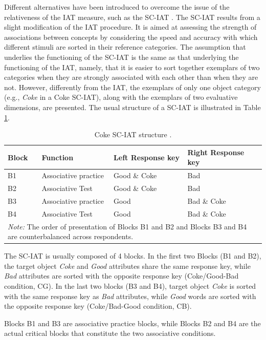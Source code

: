 \documentclass[12pt]{book}
\begin{document}
Different alternatives have been introduced to overcome the issue of the relativeness of the IAT measure, such as the SC-IAT \cite{karpinski2006}. 
The SC-IAT results from a slight modification of the IAT procedure. It is aimed at assessing  the strength of associations between concepts by considering the speed and accuracy with which different stimuli are sorted in their reference categories. 
The assumption that underlies the functioning of the SC-IAT is the same as that underlying the functioning of the IAT, namely, that it is easier to sort together exemplars of two categories when they are strongly associated with each other than when they are not. However, differently from the IAT, the exemplars of only one object category (e.g., \emph{Coke} in a Coke SC-IAT), along with the exemplars of two evaluative dimensions, are presented. 
The usual structure of a SC-IAT is illustrated in Table \ref{tab:sciatstructure}. 
\begin{table}[h!]
	\centering \doublespacing
	\caption{Coke SC-IAT structure \protect\cite<adapted from >{karpinski2006}.}
	\label{tab:sciatstructure}
	\begin{tabularx}{\textwidth}{p{1cm} p{4cm} p{4cm} p{4cm}}
		\toprule
		Block  & Function  & Left Response key & Right Response key \\
		\midrule
		B1  & Associative practice & Good \& Coke & Bad \\
		B2  & Associative Test & Good \& Coke & Bad \\
		B3  & Associative practice & Good  & Bad \& Coke \\
		B4  & Associative Test & Good  & Bad \& Coke \\
		\bottomrule
		\multicolumn{4}{p{14cm}}{\onehalfspacing\emph{Note:} The order of presentation of Blocks B1 and B2 and Blocks B3 and B4 are counterbalanced across respondents.}
	\end{tabularx}
\end{table}
The SC-IAT is usually composed of 4 blocks. 
In the first two Blocks (B1 and B2), the target object \emph{Coke} and \emph{Good} attributes share the same response key, while \emph{Bad} attributes are sorted with the opposite response key (Coke/Good-Bad condition, CG). 
In the last two blocks (B3 and B4), target object \emph{Coke} is sorted with the same response key as \emph{Bad} attributes, while \emph{Good} words are sorted with the opposite response key (Coke/Bad-Good condition, CB).  
  
Blocks B1 and B3 are associative practice blocks, while Blocks B2 and B4 are the actual critical blocks that constitute the two associative conditions. 
\end{document}
